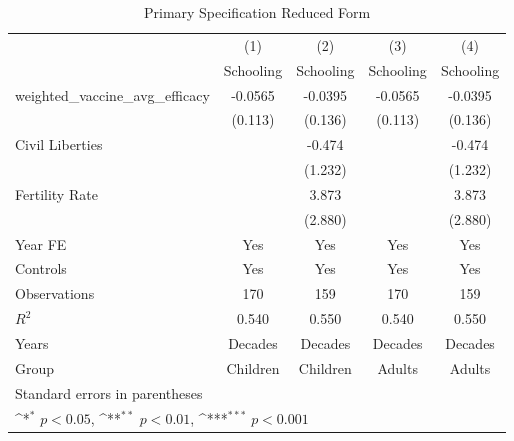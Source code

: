 \begin{table}[htbp]\centering
\def\sym#1{\ifmmode^{#1}\else\(^{#1}\)\fi}
\caption{Primary Specification Reduced Form}
\begin{tabular}{l*{4}{c}}
\toprule
                &\multicolumn{1}{c}{(1)}&\multicolumn{1}{c}{(2)}&\multicolumn{1}{c}{(3)}&\multicolumn{1}{c}{(4)}\\
                &\multicolumn{1}{c}{Schooling}&\multicolumn{1}{c}{Schooling}&\multicolumn{1}{c}{Schooling}&\multicolumn{1}{c}{Schooling}\\
\midrule
weighted\_vaccine\_avg\_efficacy&  -0.0565         &  -0.0395         &  -0.0565         &  -0.0395         \\
                &  (0.113)         &  (0.136)         &  (0.113)         &  (0.136)         \\
\addlinespace
Civil Liberties &                  &   -0.474         &                  &   -0.474         \\
                &                  &  (1.232)         &                  &  (1.232)         \\
\addlinespace
Fertility Rate  &                  &    3.873         &                  &    3.873         \\
                &                  &  (2.880)         &                  &  (2.880)         \\
\addlinespace
Year FE         &      Yes         &      Yes         &      Yes         &      Yes         \\
\addlinespace
Controls        &      Yes         &      Yes         &      Yes         &      Yes         \\
\midrule
Observations    &      170         &      159         &      170         &      159         \\
\(R^{2}\)       &    0.540         &    0.550         &    0.540         &    0.550         \\
Years           &  Decades         &  Decades         &  Decades         &  Decades         \\
Group           & Children         & Children         &   Adults         &   Adults         \\
\bottomrule
\multicolumn{5}{l}{\footnotesize Standard errors in parentheses}\\
\multicolumn{5}{l}{\footnotesize \sym{*} \(p<0.05\), \sym{**} \(p<0.01\), \sym{***} \(p<0.001\)}\\
\end{tabular}
\end{table}
